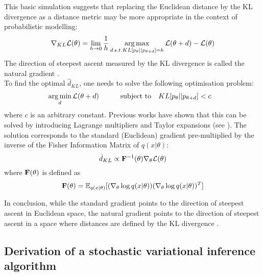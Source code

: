 This basic simulation suggests that replacing the Euclidean distance by the KL divergence as a distance metric may be more appropriate in the context of probabilistic modelling:
\[
	\nabla_{KL} \mathcal{L}(\theta) = \lim_{h\to0} \frac{1}{h}\operatorname*{arg\,max}_{d \, s.t. KL[p_\theta||p_{\theta+d}]=h} \mathcal{L}(\theta+d) - \mathcal{L}(\theta)
\]
The direction of steepest ascent measured by the KL divergence is called the natural gradient \cite{Amari1998,Martens2014}.\\
To find the optimal $\hat{d}_{KL}$, one needs to solve the following optimisation problem:
\begin{equation*} \begin{aligned}
	&\operatorname*{arg\,min}_{d} \mathcal{L}(\theta+d) \qquad
	& \text{subject to}
	& \quad KL[p_\theta||p_{\theta+d}] < c
\end{aligned} \end{equation*}
where $c$ is an arbitrary constant. Previous works have shown that this can be solved by introducing Lagrange multipliers and Taylor expansions (see \cite{Amari1998,Kristiadi2019}). The solution corresponds to the standard (Euclidean) gradient pre-multiplied by the inverse of the Fisher Information Matrix of $q(x|\theta)$:
\begin{equation}\label{natural_gradient}
	\hat{d}_{KL} \propto {\bf F}^{-1}(\theta) \nabla_{\theta} \mathcal{L}(\theta)
\end{equation}
where ${\bf F}(\theta)$ is defined as
\[
	{\bf F}(\theta) = \mathbb{E}_{q(x|\theta)}[(\nabla_\theta \log q(x|\theta)) (\nabla_\theta \log q(x|\theta))^T]
\]


In conclusion, while the standard gradient points to the direction of steepest ascent in Euclidean space, the natural gradient points to the direction of steepest ascent in a space where distances are defined by the KL divergence \cite{Kristiadi2019,Amari1998,Hoffman2012}.


\subsection{Derivation of a stochastic variational inference algorithm}

